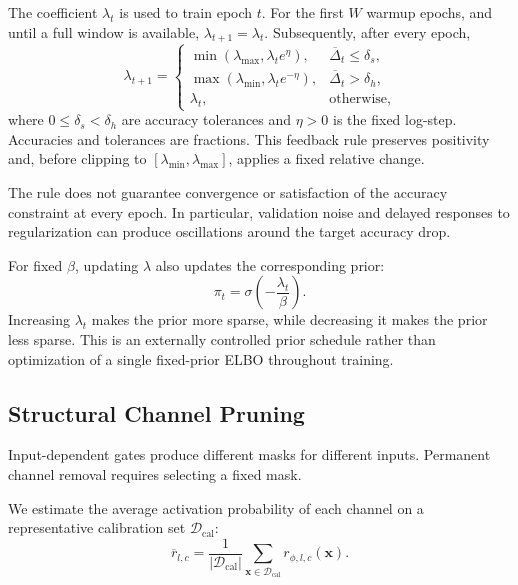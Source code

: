 \documentclass[sigplan,screen]{acmart}
\begin{document}
The coefficient $\lambda_t$ is used to train epoch $t$.
For the first $W$ warmup epochs, and until a full window is available,
$\lambda_{t+1}=\lambda_t$. Subsequently, after every epoch,
\begin{equation}
\lambda_{t+1}=
\begin{cases}
\min(\lambda_{\max},\lambda_t e^{\eta}),
& \overline\Delta_t\leq\delta_s,\\[2pt]
\max(\lambda_{\min},\lambda_t e^{-\eta}),
& \overline\Delta_t>\delta_h,\\[2pt]
\lambda_t, & \text{otherwise},
\end{cases}
\label{eq:one-shot-controller}
\end{equation}
where $0\leq\delta_s<\delta_h$ are accuracy tolerances and $\eta>0$
is the fixed log-step. Accuracies and tolerances are fractions.
This feedback rule preserves positivity and, before clipping to
$[\lambda_{\min},\lambda_{\max}]$, applies a fixed relative change.

The rule does not guarantee convergence or satisfaction
of the accuracy constraint at every epoch. In particular,
validation noise and delayed responses to regularization
can produce oscillations around the target accuracy drop.

For fixed $\beta$, updating $\lambda$ also updates the
corresponding prior:
\begin{equation}
\pi_t
=
\sigma\left(-\frac{\lambda_t}{\beta}\right).
\end{equation}
Increasing $\lambda_t$ makes the prior more sparse, while
decreasing it makes the prior less sparse. This is an
externally controlled prior schedule rather than
optimization of a single fixed-prior ELBO throughout
training.





\subsection{Structural Channel Pruning}

Input-dependent gates produce different masks for
different inputs. Permanent channel removal requires
selecting a fixed mask.

We estimate the average activation probability of each
channel on a representative calibration set
$\mathcal{D}_{\mathrm{cal}}$:
\begin{equation}
\overline{r}_{l,c}
=
\frac{1}{|\mathcal{D}_{\mathrm{cal}}|}
\sum_{\mathbf{x}\in\mathcal{D}_{\mathrm{cal}}}
r_{\phi,l,c}(\mathbf{x}).
\end{equation}
\end{document}
